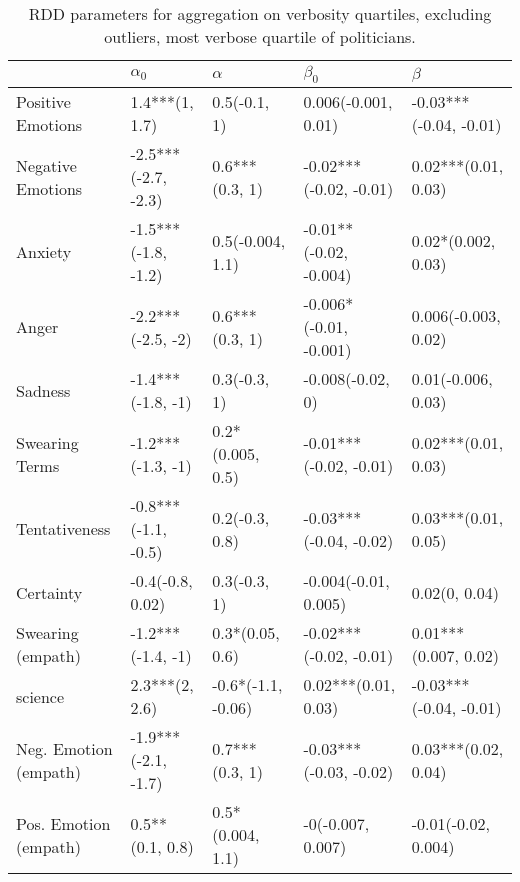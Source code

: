 \begin{table}[h]\centering
\caption{RDD parameters for aggregation on verbosity quartiles, excluding outliers, most verbose quartile of politicians.}
	\label{fig: Verbosity_2}
\begin{adjustbox}{width=\linewidth, center}
	\begin{tabular}{lllll}
	\toprule
	{} &           $\alpha_0$ &            $\alpha$ &               $\beta_0$ &                 $\beta$ \\
	\midrule
	Positive Emotions     &       1.4***(1, 1.7) &        0.5(-0.1, 1) &     0.006(-0.001, 0.01) &  -0.03***(-0.04, -0.01) \\
	Negative Emotions     &  -2.5***(-2.7, -2.3) &      0.6***(0.3, 1) &  -0.02***(-0.02, -0.01) &     0.02***(0.01, 0.03) \\
	Anxiety               &  -1.5***(-1.8, -1.2) &    0.5(-0.004, 1.1) &  -0.01**(-0.02, -0.004) &      0.02*(0.002, 0.03) \\
	Anger                 &    -2.2***(-2.5, -2) &      0.6***(0.3, 1) &  -0.006*(-0.01, -0.001) &     0.006(-0.003, 0.02) \\
	Sadness               &    -1.4***(-1.8, -1) &        0.3(-0.3, 1) &        -0.008(-0.02, 0) &      0.01(-0.006, 0.03) \\
	Swearing Terms        &    -1.2***(-1.3, -1) &    0.2*(0.005, 0.5) &  -0.01***(-0.02, -0.01) &     0.02***(0.01, 0.03) \\
	Tentativeness         &  -0.8***(-1.1, -0.5) &      0.2(-0.3, 0.8) &  -0.03***(-0.04, -0.02) &     0.03***(0.01, 0.05) \\
	Certainty             &     -0.4(-0.8, 0.02) &        0.3(-0.3, 1) &    -0.004(-0.01, 0.005) &           0.02(0, 0.04) \\
	Swearing (empath)     &    -1.2***(-1.4, -1) &     0.3*(0.05, 0.6) &  -0.02***(-0.02, -0.01) &    0.01***(0.007, 0.02) \\
	science               &       2.3***(2, 2.6) &  -0.6*(-1.1, -0.06) &     0.02***(0.01, 0.03) &  -0.03***(-0.04, -0.01) \\
	Neg. Emotion (empath) &  -1.9***(-2.1, -1.7) &      0.7***(0.3, 1) &  -0.03***(-0.03, -0.02) &     0.03***(0.02, 0.04) \\
	Pos. Emotion (empath) &      0.5**(0.1, 0.8) &    0.5*(0.004, 1.1) &       -0(-0.007, 0.007) &     -0.01(-0.02, 0.004) \\
	\bottomrule
	\end{tabular}
	
\end{adjustbox}
	\end{table}

